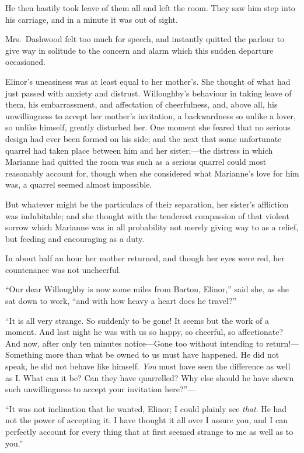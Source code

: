 He then hastily took leave of them all and left
the room.  They saw him step into his carriage,
and in a minute it was out of sight.

Mrs.\ Dashwood felt too much for speech, and instantly
quitted the parlour to give way in solitude to the concern
and alarm which this sudden departure occasioned.

Elinor's uneasiness was at least equal to her mother's.
She thought of what had just passed with anxiety and distrust.
Willoughby's behaviour in taking leave of them, his
embarrassment,
and affectation of cheerfulness, and, above all, his
unwillingness
to accept her mother's invitation, a backwardness so unlike a
lover,
so unlike himself, greatly disturbed her.  One moment she feared
that no serious design had ever been formed on his side; and the
next that some unfortunate quarrel had taken place between him
and
her sister;---the distress in which Marianne had quitted the room
was such as a serious quarrel could most reasonably account for,
though when she considered what Marianne's love for him was,
a quarrel seemed almost impossible.

But whatever might be the particulars of their separation,
her sister's affliction was indubitable; and she thought
with the tenderest compassion of that violent sorrow
which Marianne was in all probability not merely giving
way to as a relief, but feeding and encouraging as a duty.

In about half an hour her mother returned, and though
her eyes were red, her countenance was not uncheerful.

``Our dear Willoughby is now some miles from Barton, Elinor,''
said she, as she sat down to work, ``and with how heavy a heart
does he travel?''

``It is all very strange.  So suddenly to be gone! It
seems but the work of a moment.  And last night he was
with us so happy, so cheerful, so affectionate?  And now,
after only ten minutes notice---Gone too without intending
to return!---Something more than what be owned to us must
have happened.  He did not speak, he did not behave
like himself.  \emph{You} must have seen the difference as well as I.
What can it be?  Can they have quarrelled?  Why else should he
have shewn such unwillingness to accept your invitation here?''---%

``It was not inclination that he wanted, Elinor; I could
plainly see \emph{that}.  He had not the power of accepting it.
I have thought it all over I assure you, and I can
perfectly account for every thing that at first seemed
strange to me as well as to you.''

